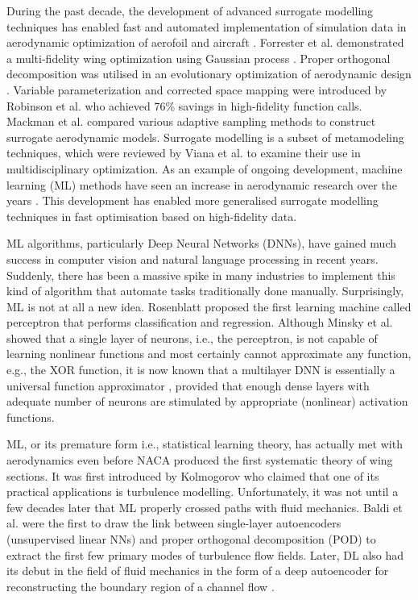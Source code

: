\documentclass[11pt]{article}
\begin{document}
During the past decade, the development of advanced surrogate modelling techniques \cite{Forrester2007Multi-fidelityModelling, Bouhlel2019ADerivatives} has enabled fast and automated implementation of simulation data in aerodynamic optimization of aerofoil and aircraft \cite{Bevan2017AdaptiveGeometry}. Forrester et al. demonstrated a multi-fidelity wing optimization using Gaussian process \cite{Forrester2008EngineeringModelling}. Proper orthogonal decomposition was utilised in an evolutionary optimization of aerodynamic design \cite{Iuliano2013ProperDesign}. Variable parameterization and corrected space mapping were introduced by Robinson et al. \cite{Robinson2008Surrogate-BasedMapping} who achieved 76\% savings in high-fidelity function calls. Mackman et al. \cite{Mackman2013ComparisonModels} compared various adaptive sampling methods to construct surrogate aerodynamic models. Surrogate modelling is a subset of metamodeling techniques, which were reviewed by Viana et al. \cite{Viana2014SpecialCome} to examine their use in multidisciplinary optimization. As an example of ongoing development, machine learning (ML) methods have seen an increase in aerodynamic research over the years \cite{Sun2019ADesign}. This development has enabled more generalised surrogate modelling techniques in fast optimisation based on high-fidelity data.

ML algorithms, particularly Deep Neural Networks (DNNs), have gained much success in computer vision and natural language processing in recent years. Suddenly, there has been a massive spike in many industries to implement this kind of algorithm that automate tasks traditionally done manually. Surprisingly, ML is not at all a new idea. Rosenblatt \cite{Rosenblatt1958TheBrain} proposed the first learning machine called perceptron that performs classification and regression. Although Minsky et al. \cite{Minsky1988PerceptronsGeometry} showed that a single layer of neurons, i.e., the perceptron, is not capable of learning nonlinear functions and most certainly cannot approximate any function, e.g., the XOR function, it is now known that a multilayer DNN is essentially a universal function approximator \cite{Brunton2020MachineMechanics}, provided that enough dense layers with adequate number of neurons are stimulated by appropriate (nonlinear) activation functions.

ML, or its premature form i.e., statistical learning theory, has actually met with aerodynamics even before NACA produced the first systematic theory of wing sections. It was first introduced by Kolmogorov \cite{Kolmogorov2010TheNumbers} who claimed that one of its practical applications is turbulence modelling. Unfortunately, it was not until a few decades later that ML properly crossed paths with fluid mechanics. Baldi et al. \cite{Baldi1989NeuralMinima} were the first to draw the link between single-layer autoencoders (unsupervised linear NNs) and proper orthogonal decomposition (POD) to extract the first few primary modes of turbulence flow fields. Later, DL also had its debut in the field of fluid mechanics in the form of a deep autoencoder for reconstructing the boundary region of a channel flow \cite{Milano2002NeuralFlow}.
\end{document}

